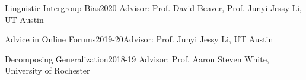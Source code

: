       {Linguistic Intergroup Bias}{2020-}{Advisor: Prof. David Beaver, Prof. Junyi Jessy Li, UT Austin}{}

      {Advice in Online Forums}{2019-20}{Advisor: Prof. Junyi Jessy Li, UT Austin}{}

        {Decomposing Generalization}{2018-19}
        {Advisor: Prof. Aaron Steven White, University of Rochester}{}

